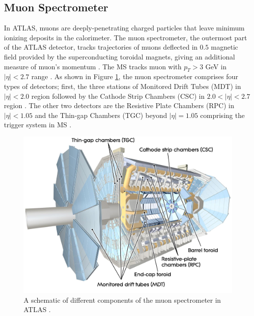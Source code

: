 \subsection{Muon Spectrometer}
\label{subsec:MS}
In ATLAS, muons are deeply-penetrating charged particles that leave minimum ionizing deposits in the calorimeter. The muon spectrometer, the outermost part of the ATLAS detector, tracks trajectories of muons deflected in $0.5$ magnetic field provided by the superconducting toroidal magnets, giving an additional measure of muon's momentum \cite{ATLAS}. The MS tracks muon with $p_{T} > 3$ GeV in $|\eta| < 2.7$ range \cite{ATLAS}. As shown in Figure \ref{fig:ATLAS_MS}, the muon spectrometer comprises four types of detectors; first, the three stations of Monitored Drift Tubes (MDT) in $|\eta| < 2.0$ region followed by the Cathode Strip Chambers (CSC) in  $2.0 < |\eta| < 2.7$ region \cite{ATLAS}. The other two detectors are the Resistive Plate Chambers (RPC) in $|\eta| < 1.05$ and the Thin-gap Chambers (TGC) beyond $|\eta| = 1.05$ comprising the trigger system in MS \cite{ATLAS}. 

\begin{figure}
    \centering
    \includegraphics[width=.98\linewidth]{figures/LHC/ATLAS_MS.jpeg}
    \caption{ A schematic of different components of the muon spectrometer in ATLAS \cite{ATLAS}.\label{fig:ATLAS_MS}}
\end{figure}